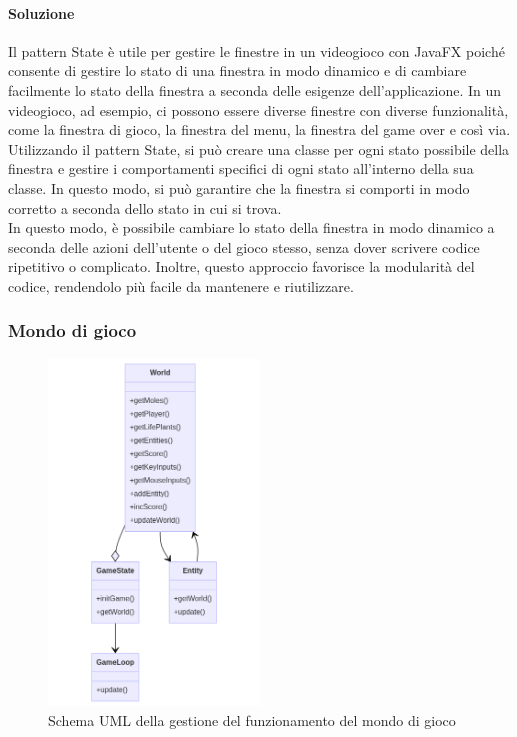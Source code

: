 \documentclass[a4paper,12pt]{report}
\begin{document}
\paragraph*{Soluzione} Il pattern State è utile per gestire le finestre in un videogioco con JavaFX poiché 
consente di gestire lo stato di una finestra in modo dinamico e di cambiare facilmente lo stato della finestra a seconda delle esigenze 
dell'applicazione. In un videogioco, ad esempio, ci possono essere diverse finestre con diverse funzionalità, come la finestra di gioco, 
la finestra del menu, la finestra del game over e così via.
\\
Utilizzando il pattern State, si può creare una classe per ogni stato possibile della finestra e gestire i comportamenti specifici 
di ogni stato all'interno della sua classe. In questo modo, si può garantire che la finestra si comporti
 in modo corretto a seconda dello stato in cui si trova.
 \\
 In questo modo, è possibile cambiare lo stato della finestra in modo dinamico a seconda delle azioni dell'utente o del gioco stesso,
  senza dover scrivere codice ripetitivo o complicato. 
 Inoltre, questo approccio favorisce la modularità del codice, rendendolo più facile da mantenere e riutilizzare.

\subsubsection*{Mondo di gioco}
\begin{figure}[h]
\centering{}
\includegraphics[width=0.50\textwidth]{img/GameWorld.png}
\caption{Schema UML della gestione del funzionamento del mondo di gioco}
\end{figure}
\end{document}
